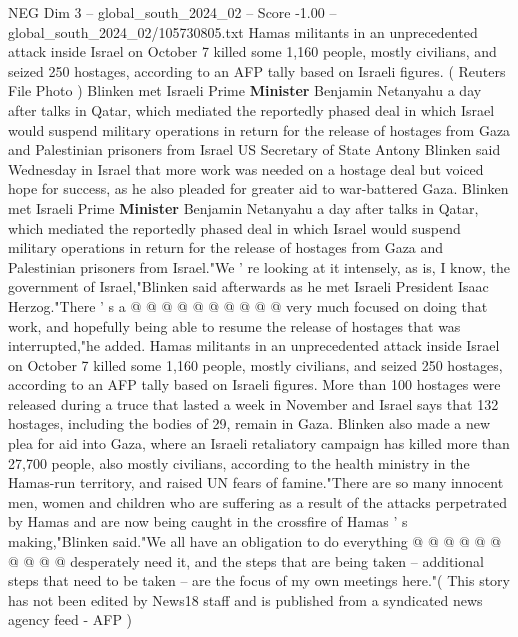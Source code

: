 \begin{textsample}{NEG Dim 3 – global\_south\_2024\_02 – Score -1.00 – global\_south\_2024\_02/105730805.txt}  \label{ex:f3_neg_088}
Hamas militants in an unprecedented attack inside Israel on October 7 killed some 1,160 people, mostly civilians, and seized 250 hostages, according to an AFP tally based on Israeli figures. ( Reuters File Photo ) Blinken met Israeli Prime \textbf{Minister} Benjamin Netanyahu a day after talks in Qatar, which mediated the reportedly phased deal in which Israel would suspend military operations in return for the release of hostages from Gaza and Palestinian prisoners from Israel US Secretary of State Antony Blinken said Wednesday in Israel that more work was needed on a hostage deal but voiced hope for success, as he also pleaded for greater aid to war-battered Gaza.
Blinken met Israeli Prime \textbf{Minister} Benjamin Netanyahu a day after talks in Qatar, which mediated the reportedly phased deal in which Israel would suspend military operations in return for the release of hostages from Gaza and Palestinian prisoners from Israel."We ' re looking at it intensely, as is, I know, the government of Israel,"Blinken said afterwards as he met Israeli President Isaac Herzog."There ' s a @ @ @ @ @ @ @ @ @ @ very much focused on doing that work, and hopefully being able to resume the release of hostages that was interrupted,"he added.
Hamas militants in an unprecedented attack inside Israel on October 7 killed some 1,160 people, mostly civilians, and seized 250 hostages, according to an AFP tally based on Israeli figures.
More than 100 hostages were released during a truce that lasted a week in November and Israel says that 132 hostages, including the bodies of 29, remain in Gaza.
Blinken also made a new plea for aid into Gaza, where an Israeli retaliatory campaign has killed more than 27,700 people, also mostly civilians, according to the health ministry in the Hamas-run territory, and raised UN fears of famine."There are so many innocent men, women and children who are suffering as a result of the attacks perpetrated by Hamas and are now being caught in the crossfire of Hamas ' s making,"Blinken said."We all have an obligation to do everything @ @ @ @ @ @ @ @ @ @ desperately need it, and the steps that are being taken -- additional steps that need to be taken -- are the focus of my own meetings here."( This story has not been edited by News18 staff and is published from a syndicated news agency feed - AFP )

\end{textsample}
